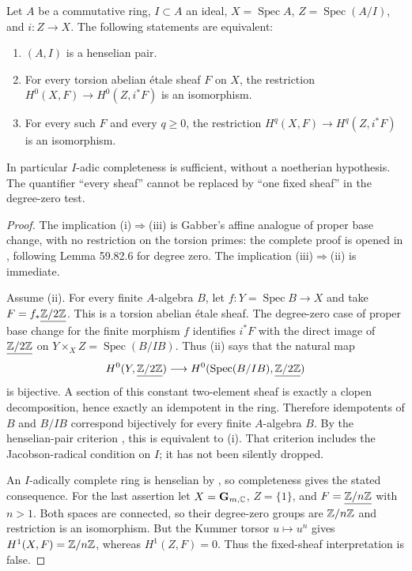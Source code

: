 \begin{theorem}\label{thm:B3-21}
Let $A$ be a commutative ring, $I\subset A$ an ideal,
$X=\operatorname{Spec}A$, $Z=\operatorname{Spec}(A/I)$, and $i:Z\to X$.
The following statements are equivalent:
\begin{enumerate}[label=(\roman*)]
\item $(A,I)$ is a henselian pair.
\item For every torsion abelian \'etale sheaf $F$ on $X$, the restriction
$H^0(X,F)\to H^0(Z,i^*F)$ is an isomorphism.
\item For every such $F$ and every $q\ge0$, the restriction
$H^q(X,F)\to H^q(Z,i^*F)$ is an isomorphism.
\end{enumerate}
In particular $I$-adic completeness is sufficient, without a noetherian
hypothesis. The quantifier ``every sheaf'' cannot be replaced by ``one
fixed sheaf'' in the degree-zero test.
\end{theorem}
\begin{proof}
The implication (i)$\Rightarrow$(iii) is Gabber's affine analogue of
proper base change, with no restriction on the torsion primes: the
complete proof is opened in \cite[Theorem 59.82.7, tag 09ZI]{BStacks},
following Lemma 59.82.6 for degree zero. The implication
(iii)$\Rightarrow$(ii) is immediate.

Assume (ii). For every finite $A$-algebra $B$, let
$f:Y=\operatorname{Spec}B\to X$ and take
$F=f_*\underline{{\mathbb{Z}}/2{\mathbb{Z}}}$. This is a torsion abelian \'etale sheaf.
The degree-zero case of proper base change for the finite morphism $f$
identifies $i^*F$ with the direct image of
$\underline{{\mathbb{Z}}/2{\mathbb{Z}}}$ on
$Y\times_X Z=\operatorname{Spec}(B/IB)$.
Thus (ii) says that the natural map
\[
 H^0(Y,\underline{{\mathbb{Z}}/2{\mathbb{Z}}})\longrightarrow
 H^0(\operatorname{Spec}(B/IB),\underline{{\mathbb{Z}}/2{\mathbb{Z}}})
\]
is bijective. A section of this constant two-element sheaf is exactly
a clopen decomposition, hence exactly an idempotent in the ring.
Therefore idempotents of $B$ and $B/IB$ correspond bijectively for every
finite $A$-algebra $B$. By the henselian-pair criterion
\cite[Lemma 15.11.6, tag 09XI]{BStacks}, this is equivalent to (i).
That criterion includes the Jacobson-radical condition on $I$; it has
not been silently dropped.

An $I$-adically complete ring is henselian by
\cite[Lemma 15.11.4, tag 0ALJ]{BStacks}, so completeness gives the
stated consequence. For the last assertion let
$X=\mathbf G_{m,{\mathbb{C}}}$, $Z=\{1\}$, and $F=\underline{{\mathbb{Z}}/n{\mathbb{Z}}}$ with
$n>1$. Both spaces are connected, so their degree-zero groups are
${\mathbb{Z}}/n{\mathbb{Z}}$ and restriction is an isomorphism. But the Kummer torsor
$u\mapsto u^n$ gives
$H^1(X,F)={\mathbb{Z}}/n{\mathbb{Z}}$, whereas $H^1(Z,F)=0$.
Thus the fixed-sheaf interpretation is false.
\end{proof}

